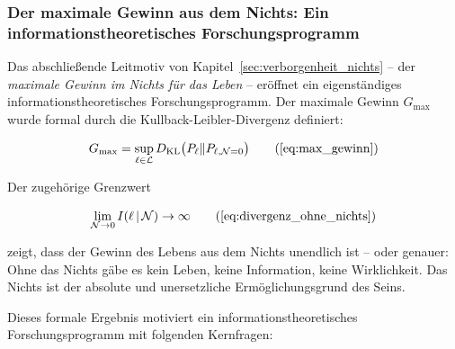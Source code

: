 ﻿\documentclass[12pt,a4paper]{report}
\begin{document}
\subsubsection{Der maximale Gewinn aus dem Nichts: Ein informationstheoretisches Forschungsprogramm}

Das abschließende Leitmotiv von Kapitel~\ref{sec:verborgenheit_nichts} -- der \textit{maximale Gewinn im Nichts für das Leben} -- eröffnet ein eigenständiges informationstheoretisches Forschungsprogramm. Der maximale Gewinn $G_{\max}$ wurde formal durch die Kullback-Leibler-Divergenz definiert:

\begin{equation}
	G_{\max} = \sup_{\ell \in \mathcal{L}} D_{\text{KL}}\bigl(P_\ell \| P_{\ell,\mathcal{N}=0}\bigr)
	\tag{\ref{eq:max_gewinn}}
\end{equation}

Der zugehörige Grenzwert

\begin{equation}
	\lim_{\mathcal{N} \to 0} I(\ell\,|\,\mathcal{N}) \to \infty
	\tag{\ref{eq:divergenz_ohne_nichts}}
\end{equation}

zeigt, dass der Gewinn des Lebens aus dem Nichts unendlich ist -- oder genauer: Ohne das Nichts gäbe es kein Leben, keine Information, keine Wirklichkeit. Das Nichts ist der absolute und unersetzliche Ermöglichungsgrund des Seins.

Dieses formale Ergebnis motiviert ein informationstheoretisches Forschungsprogramm mit folgenden Kernfragen:
\end{document}
